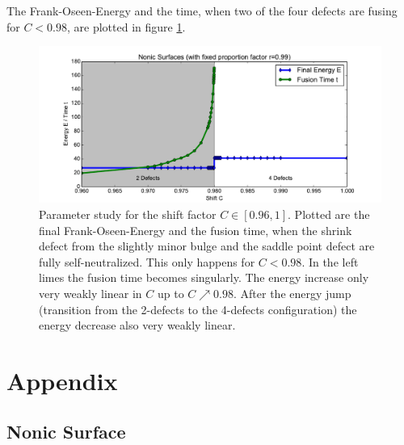\documentclass[a4paper,11pt]{scrartcl}
\begin{document}
    The Frank-Oseen-Energy and the time, when two of the four defects are fusing for \( C < 0.98 \), are plotted in figure
    \ref{figNonicExperiment}. 
    \begin{figure}
      \centering
      \includegraphics[width=.99\textwidth]{bilder/nonicExperiment.pdf}
      \caption{Parameter study for the shift factor \( C\in[0.96,1] \).
               Plotted are the final Frank-Oseen-Energy and the fusion time, when the shrink defect from the slightly minor bulge and the saddle
               point defect are fully self-neutralized.
               This only happens for \( C < 0.98 \). 
               In the left limes the fusion time becomes singularly.
               The energy increase only very weakly linear in \( C \) up to \( C \nearrow 0.98 \). 
               After the energy jump (transition from the 2-defects to the 4-defects configuration) the energy decrease also very weakly linear.
               }
      \label{figNonicExperiment}
    \end{figure}


\section{Appendix}

  \subsection{Nonic Surface}
    
  



\end{document}
